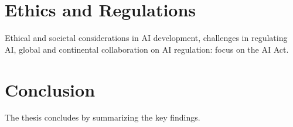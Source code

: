 \documentclass[12pt]{article}
\begin{document}
\section{Ethics and Regulations}
Ethical and societal considerations in AI development, challenges in regulating AI, global and continental collaboration on AI regulation: focus on the AI Act.

\section{Conclusion}
The thesis concludes by summarizing the key findings.

\newpage

\nocite{*}


\end{document}
